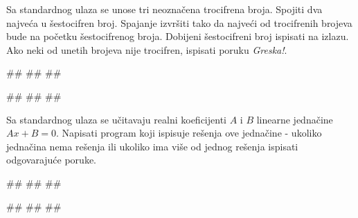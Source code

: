 \begin{Exercise}[label=p1.2_] 
 Sa standardnog ulaza se unose tri neoznačena trocifrena broja. Spojiti
dva najveća u šestocifren broj. Spajanje izvršiti tako da najveći od trocifrenih
brojeva bude na početku šestocifrenog broja. Dobijeni šestocifreni broj ispisati
na izlazu. Ako neki od unetih brojeva nije trocifren, ispisati poruku \textit{Greska!}.\\
\begin{miditest}
\begin{upotreba}{1}
#\naslovInt#
##
##
\end{upotreba}
\end{miditest}
\begin{miditest}
\begin{upotreba}{2}
#\naslovInt#
##
##
\end{upotreba}
\end{miditest}

\end{Exercise}
\begin{Answer}[ref=p1.2_]
\end{Answer}

\begin{Exercise}[label=p1.2_] 
 Sa standardnog ulaza se učitavaju realni koeficijenti $A$ i $B$ linearne jednačine $Ax+B = 0$. Napisati program koji ispisuje rešenja ove jednačine - ukoliko jednačina nema rešenja ili ukoliko ima više od jednog rešenja ispisati odgovarajuće poruke.\\
\begin{miditest}
\begin{upotreba}{1}
#\naslovInt#
##
##
\end{upotreba}
\end{miditest}
\begin{miditest}
\begin{upotreba}{2}
#\naslovInt#
##
##
\end{upotreba}
\end{miditest}




\end{Exercise}
\begin{Answer}[ref=p1.2_]
\end{Answer}

